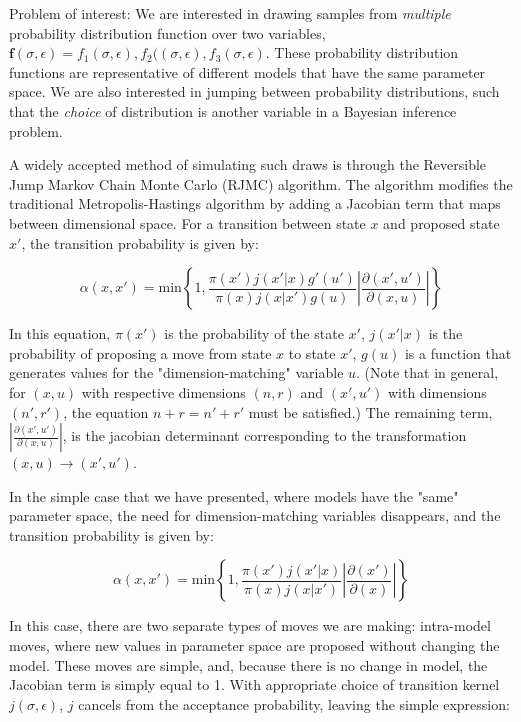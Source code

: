 \documentclass[12pt]{minimal}
\begin{document}
Problem of interest: We are interested in drawing samples from \emph{multiple} probability distribution function over two variables, $ \mathbf{f}(\sigma, \epsilon)= f_1(\sigma, \epsilon), f_2((\sigma, \epsilon),f_3(\sigma, \epsilon) $. These probability distribution functions are representative of different models that have the same parameter space.  We are also interested in jumping between probability distributions, such that the \emph{choice} of distribution is another variable in a Bayesian inference problem. 

 A widely accepted method of simulating such draws is through the Reversible Jump Markov Chain Monte Carlo (RJMC) algorithm.  The algorithm modifies the traditional Metropolis-Hastings algorithm by adding a Jacobian term that maps between dimensional space.  For a transition between state $x$ and proposed state $x'$, the transition probability is given by:

\begin{equation}

\alpha(x,x') = \mathrm{min} \left \{ 1, \frac{\pi(x')j(x'|x)g'(u')}{\pi(x)j(x|x')g(u)} \left | \frac{\partial(x',u')}{\partial(x,u)} \right | \right \}
\end{equation}

In this equation, $\pi(x')$ is the probability of the state $x'$, $j(x'|x)$ is the probability of proposing a move from state $x$ to state $x'$, $g(u)$ is a function that generates values for the "dimension-matching" variable $u$. (Note that in general, for $(x,u)$ with respective dimensions $(n,r)$ and $(x',u')$ with dimensions $(n',r')$, the equation $n+r=n'+r'$ must be satisfied.)  The remaining term, $\left | \frac{\partial(x',u')}{\partial(x,u)} \right |$, is the jacobian determinant corresponding to the transformation $(x,u) \rightarrow (x',u')$.

In the simple case that we have presented, where models have the "same" parameter space, the need for dimension-matching variables disappears, and the transition probability is given by:

\begin{equation}
\alpha(x,x') = \mathrm{min} \left \{ 1, \frac{\pi(x')j(x'|x)}{\pi(x)j(x|x')} \left | \frac{\partial(x')}{\partial(x)} \right | \right \}

\end{equation}

In this case, there are two separate types of moves we are making: intra-model moves, where new values in parameter space are proposed without changing the model.  These moves are simple, and, because there is no change in model, the Jacobian term is simply equal to 1.  With appropriate choice of transition kernel $j(\sigma, \epsilon)$, $j$ cancels from the acceptance probability, leaving the simple expression:
\end{document}
